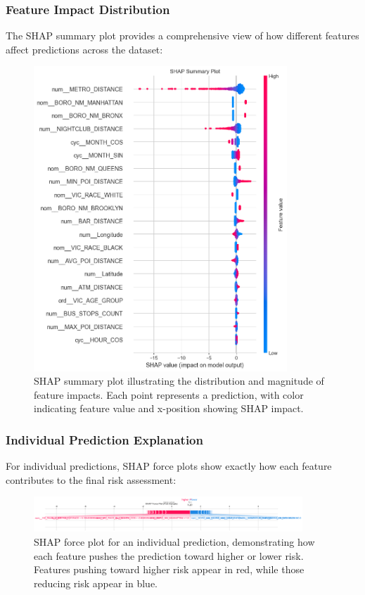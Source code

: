 \documentclass[11pt]{article}
\begin{document}
\subsubsection{Feature Impact Distribution}
The SHAP summary plot provides a comprehensive view of how different features affect predictions across the dataset:

\begin{figure}[H]
\centering
\includegraphics[width=0.85\textwidth]{LogisticRegression_shap_summary.png}
\caption{SHAP summary plot illustrating the distribution and magnitude of feature impacts. Each point represents a prediction, with color indicating feature value and x-position showing SHAP impact.}
\label{fig:shap_summary}
\end{figure}

\subsubsection{Individual Prediction Explanation}
For individual predictions, SHAP force plots show exactly how each feature contributes to the final risk assessment:

\begin{figure}[H]
\centering
\includegraphics[width=0.9\textwidth]{LogisticRegression_shap_force.png}
\caption{SHAP force plot for an individual prediction, demonstrating how each feature pushes the prediction toward higher or lower risk. Features pushing toward higher risk appear in red, while those reducing risk appear in blue.}
\label{fig:shap_force}
\end{figure}
\end{document}
